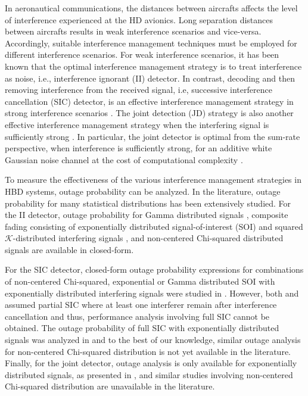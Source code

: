 In aeronautical communications, the distances between aircrafts affects the level of interference experienced at the HD avionics. Long separation distances between aircrafts results in weak interference scenarios and vice-versa. Accordingly, suitable interference management techniques must be employed for different interference scenarios. For weak interference scenarios, it has been known that the optimal interference management strategy is to treat interference as noise, i.e., interference ignorant (II) \cite{annapureddy2009gaussian,zahavi2017cooperation} detector. In contrast, decoding and then removing interference from the received signal, i.e, successive interference cancellation (SIC) detector, is an effective interference management strategy in strong interference scenarios \cite{qu2014understanding,weber2007transmission}. The joint detection (JD) strategy is also another effective interference management strategy when the interfering signal is sufficiently strong \cite{zahavi2017cooperation,zhou2015mac,shubhi2017joint,blomer2009transmission}. In particular, the joint detector is optimal from the sum-rate perspective, when interference is sufficiently strong, for an additive white Gaussian noise channel \cite{zahavi2017cooperation} at the cost of computational complexity \cite{zhou2015mac,shubhi2017joint}.

To measure the effectiveness of the various interference management strategies in HBD systems, outage probability can be analyzed. In the literature, outage probability for many statistical distributions has been extensively studied. For the II detector, outage probability for Gamma distributed signals \cite{yao1992investigations}, composite fading consisting of exponentially distributed signal-of-interest (SOI) and squared ${\mathcal{K}}$-distributed interfering signals \cite{bithas2015mobile}, and non-centered Chi-squared distributed signals \cite{rached2017unified} are available in closed-form. 

For the SIC detector, closed-form outage probability expressions for combinations of non-centered Chi-squared, exponential or Gamma distributed SOI with exponentially distributed interfering signals were studied in \cite{hasna2003performance,romero2008receive}. However, both \cite{hasna2003performance} and \cite{romero2008receive} assumed partial SIC where at least one interferer remain after interference cancellation and thus, performance analysis involving full SIC cannot be obtained. The outage probability of full SIC with exponentially distributed signals was analyzed in \cite{zhang2017full} and to the best of our knowledge, similar outage analysis for non-centered Chi-squared distribution is not yet available in the literature. Finally, for the joint detector, outage analysis is only available for exponentially distributed signals, as presented in \cite{narasimhan2007individual}, and similar studies involving non-centered Chi-squared distribution are unavailable in the literature.

